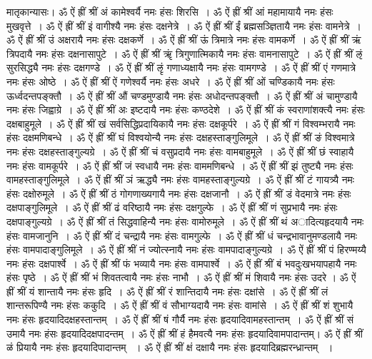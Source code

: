 मातृकान्यासः।
ॐ ऐं ह्रीं श्रीं अं कामेश्वर्यै नमः हंसः शिरसि~। 
ॐ ऐं ह्रीं श्रीं आं महामायायै नमः हंसः मुखवृत्ते~। 
ॐ ऐं ह्रीं श्रीं इं वागीश्यै नमः हंसः दक्षनेत्रे~। 
ॐ ऐं ह्रीं श्रीं ईं ब्रह्मसञ्ज्ञितायै नमः हंसः वामनेत्रे~। 
ॐ ऐं ह्रीं श्रीं उं अक्षरायै नमः हंसः दक्षकर्णे~। 
ॐ ऐं ह्रीं श्रीं ऊं त्रिमात्रे नमः हंसः वामकर्णे~। 
ॐ ऐं ह्रीं श्रीं ऋं त्रिपदायै नमः हंसः दक्षनासापुटे~। 
ॐ ऐं ह्रीं श्रीं ॠं त्रिगुणात्मिकायै नमः हंसः वामनासापुटे~। 
ॐ ऐं ह्रीं श्रीं ऌं सुरसिद्ध्यै नमः हंसः दक्षगण्डे~। 
ॐ ऐं ह्रीं श्रीं ऌृं गणाध्यक्षायै नमः हंसः वामगण्डे~। 
ॐ ऐं ह्रीं श्रीं एं गणमात्रे नमः हंसः ओष्ठे~। 
ॐ ऐं ह्रीं श्रीं ऐं गणेश्वर्यै नमः हंसः अधरे~। 
ॐ ऐं ह्रीं श्रीं ओं चण्डिकायै नमः हंसः ऊर्ध्वदन्तपङ्क्तौ~। 
ॐ ऐं ह्रीं श्रीं औं चण्डमुण्डायै नमः हंसः अधोदन्तपङ्क्तौ~। 
ॐ ऐं ह्रीं श्रीं अं चामुण्डायै नमः हंसः जिह्वाग्रे~। 
ॐ ऐं ह्रीं श्रीं अः इष्टदायै नमः हंसः कण्ठदेशे~। 
ॐ ऐं ह्रीं श्रीं कं स्वराणांशक्त्यै नमः हंसः दक्षबाहुमूले~। 
ॐ ऐं ह्रीं श्रीं खं सर्वसिद्धिप्रदायिकायै नमः हंसः दक्षकूर्परे~। 
ॐ ऐं ह्रीं श्रीं गं विश्वम्भरायै नमः हंसः दक्षमणिबन्धे~। 
ॐ ऐं ह्रीं श्रीं घं विश्वयोन्यै नमः हंसः दक्षहस्ताङ्गुलिमूले~। 
ॐ ऐं ह्रीं श्रीं ङं विश्वमात्रे नमः हंसः दक्षहस्ताङ्गुल्यग्रे~। 
ॐ ऐं ह्रीं श्रीं चं वसुप्रदायै नमः हंसः वामबाहुमूले~। 
ॐ ऐं ह्रीं श्रीं छं स्वाहायै नमः हंसः वामकूर्परे~। 
ॐ ऐं ह्रीं श्रीं जं स्वधायै नमः हंसः वाममणिबन्धे~। 
ॐ ऐं ह्रीं श्रीं झं तुष्ट्यै नमः हंसः वामहस्ताङ्गुलिमूले~। 
ॐ ऐं ह्रीं श्रीं ञं ऋद्ध्यै नमः हंसः वामहस्ताङ्गुल्यग्रे~। 
ॐ ऐं ह्रीं श्रीं टं गायत्र्यै नमः हंसः दक्षोरुमूले~। 
ॐ ऐं ह्रीं श्रीं ठं गोगणाख्यगायै नमः हंसः दक्षजानौ~। 
ॐ ऐं ह्रीं श्रीं डं वेदमात्रे नमः हंसः दक्षपाङ्गुलिमूले~। 
ॐ ऐं ह्रीं श्रीं ढं वरिष्ठायै नमः हंसः दक्षगुल्फे~। 
ॐ ऐं ह्रीं श्रीं णं सुप्रभायै नमः हंसः दक्षपाङ्गुल्यग्रे~। 
ॐ ऐं ह्रीं श्रीं तं सिद्धवाहिन्यै नमः हंसः वामोरुमूले~।
ॐ ऐं ह्रीं श्रीं थं अादित्यहृदयायै नमः हंसः वामजानुनि~। 
ॐ ऐं ह्रीं श्रीं दं चन्द्रायै नमः हंसः वामगुल्फे~। 
ॐ ऐं ह्रीं श्रीं धं चन्द्रभावानुमण्डलायै नमः हंसः वामपादाङ्गुलिमूले~। 
ॐ ऐं ह्रीं श्रीं नं ज्योत्स्नायै नमः हंसः वामपादाङ्गुल्यग्रे~। 
ॐ ऐं ह्रीं श्रीं पं हिरण्मय्यै नमः हंसः दक्षपार्श्वे~। 
ॐ ऐं ह्रीं श्रीं फं भव्यायै नमः हंसः वामपार्श्वे~।
ॐ ऐं ह्रीं श्रीं बं भवदुःखभयापहायै नमः हंसः पृष्ठे~।
ॐ ऐं ह्रीं श्रीं भं शिवतत्वायै नमः हंसः नाभौ~। 
ॐ ऐं ह्रीं श्रीं मं शिवायै नमः हंसः उदरे ।
ॐ ऐं ह्रीं श्रीं यं शान्तायै नमः हंसः हृदि~। 
ॐ ऐं ह्रीं श्रीं रं शान्तिदायै नमः हंसः दक्षांसे~। 
ॐ ऐं ह्रीं श्रीं लं शान्तरूपिण्यै नमः हंसः ककुदि~। 
ॐ ऐं ह्रीं श्रीं वं सौभाग्यदायै नमः हंसः वामांसे~। 
ॐ ऐं ह्रीं श्रीं शं शुभायै नमः हंसः हृदयादिदक्षहस्तान्तम्~।
ॐ ऐं ह्रीं श्रीं षं गौर्यै नमः हंसः हृदयादिवामहस्तान्तम्~। 
ॐ ऐं ह्रीं श्रीं सं उमायै नमः हंसः हृदयादिदक्षपादन्तम्~। 
ॐ ऐं ह्रीं श्रीं हं हैमवत्यै नमः हंसः हृदयादिवामपादान्तम्। 
ॐ ऐं ह्रीं श्रीं ळं प्रियायै नमः हंसः हृदयादिपादान्तम् ~। 
ॐ ऐं ह्रीं श्रीं क्षं दक्षायै नमः हंसः हृदयादिब्रह्मरन्ध्रान्तम् ~।

